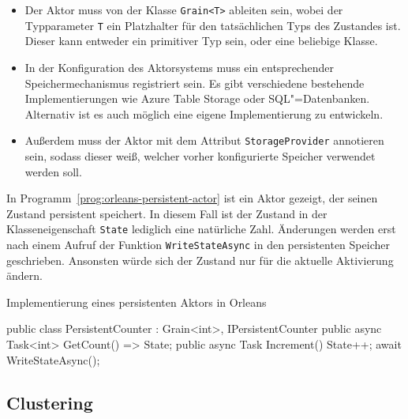 \begin{itemize}
	\item Der Aktor muss von der Klasse \lstinline{Grain<T>} ableiten sein, wobei der Typparameter \lstinline{T} ein Platzhalter für den tatsächlichen Typs des Zustandes ist. Dieser kann entweder ein primitiver Typ sein, oder eine beliebige Klasse.
	\item In der Konfiguration des Aktorsystems muss ein entsprechender Speichermechanismus registriert sein. Es gibt verschiedene bestehende Implementierungen wie \zB Azure Table Storage oder SQL"=Datenbanken. Alternativ ist es auch möglich eine eigene Implementierung zu entwickeln.
	\item Außerdem muss der Aktor mit dem Attribut \lstinline{StorageProvider} annotieren sein, sodass dieser weiß, welcher vorher konfigurierte Speicher verwendet werden soll.
\end{itemize}

In Programm~\ref{prog:orleans-persistent-actor} ist ein Aktor gezeigt, der seinen Zustand persistent speichert. In diesem Fall ist der Zustand in der Klasseneigenschaft \lstinline{State} lediglich eine natürliche Zahl. Änderungen werden erst nach einem Aufruf der Funktion \lstinline{WriteStateAsync} in den persistenten Speicher geschrieben. Ansonsten würde sich der Zustand nur für die aktuelle Aktivierung ändern.

\begin{program}[!hbt]
\caption{Implementierung eines persistenten Aktors in Orleans}
\label{prog:orleans-persistent-actor}
\begin{CsCode}
[StorageProvider(ProviderName="<provider-name>")]
public class PersistentCounter : Grain<int>, IPersistentCounter   {
	public async Task<int> GetCount() => State;
	public async Task Increment() {
		State++;
		await WriteStateAsync();
	}
}
\end{CsCode}
\end{program}

\subsection{Clustering}

